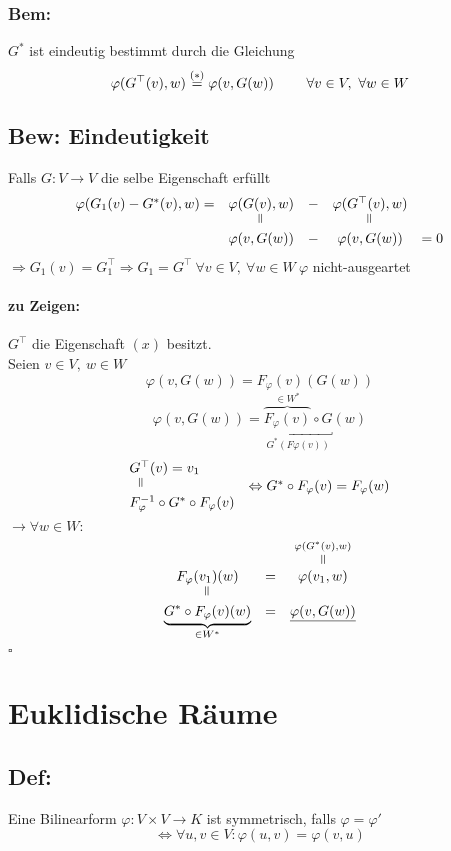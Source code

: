\documentclass[titlepage,12pt,a4paper,ngerman]{report}
\newenvironment{bew}[1]{\subsection{Bew: #1}}{\hfill$\square$}
\newcommand{\Bew}[2]{\begin{bew}{#1}#2\end{bew}}
\newcommand{\verteq}{\rotatebox{90}{$\,=$}}
\newcommand{\equaltoup}[2]{\overset{\scriptstyle\underset{\mkern4mu\verteq}{#2}}{#1}}
\begin{document}
\subsubsection*{Bem:}
$G^*$ ist eindeutig bestimmt durch die Gleichung 
$$\varphi(G^\top(v),w) \buildrel (*) \over = \varphi(v,G(w))\qquad \ \forall v \in V,\ \forall w \in W$$
\Bew{Eindeutigkeit}{
	Falls $G:V\to V$ die selbe Eigenschaft erfüllt
	$$ \begin{array}{ccccc}
	\varphi(G_1(v) - G^* (v),w) = & \varphi(G(v),w) & - & \varphi (G^\top (v),w) \\
	& \verteq & &  \verteq \\
	& \varphi(v, G(w)) & - & \varphi(v,G(w)) & = 0
	\end{array}$$
	$\Rightarrow G_1(v) = G_1^\top \Rightarrow G_1=G^\top\ \forall v \in V,\ \forall w \in W\ \varphi$ nicht-ausgeartet 
	\paragraph{zu Zeigen:} $G^\top$ die Eigenschaft $(x)$ besitzt.\\
	Seien \underline{$v \in V,\ w \in W$} 
	$$\varphi(v,G(w)) = F_\varphi(v)(G(w))$$
	$$\varphi(v,G(w)) = \underbracket{\overbrace{F_\varphi(v)}^{\in W^*} \circ G}_{G^*(F\varphi(v))}(w)$$
	$$ \begin{array}{lc}
	G^\top(v)  = v_1 \\
	\ \ \verteq & \Leftrightarrow G^* \circ F_\varphi(v) = F_\varphi(w)\\
	F^{-1}_{\varphi}\circ G^* \circ F_\varphi(v)
	\end{array}$$
	$\rightarrow \forall w \in W:$
	$$\begin{array}{ccc}
	F_\varphi(v_1)(w) & = & \equaltoup{\varphi(v_1,w)}{\varphi(G^*(v),w)}\\
	\verteq \\
	\underbrace{G^* \circ F_\varphi(v)(w)}_{\in W^*} & = & \underline{\varphi(v,G(w))}
	\end{array}$$
}

\section{Euklidische Räume}
\subsection{Def:}
Eine Bilinearform $ \varphi: V \times V \to K$ ist symmetrisch, falls $ \varphi = \varphi' $ 
$$ \Leftrightarrow \forall u,v \in V : \varphi(u,v) = \varphi(v,u) $$
\end{document}

